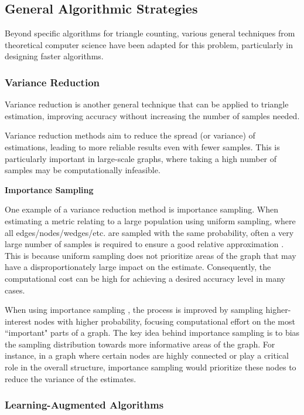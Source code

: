 \documentclass[12pt]{article}
\newcommand{\subsubsubsection}[1]{
  \vspace{1em} %
  \noindent\textbf{#1} %
  \vspace{0.5em} %
}
\begin{document}
\subsection{General Algorithmic Strategies}

Beyond specific algorithms for triangle counting, various general techniques from theoretical computer science have been adapted for this problem, particularly in designing faster algorithms.

\subsubsection{Variance Reduction}

Variance reduction \cite{prescott_monte_1965} is another general technique that can be applied to triangle estimation, improving accuracy without increasing the number of samples needed.

Variance reduction methods aim to reduce the spread (or variance) of estimations, leading to more reliable results even with fewer samples.
This is particularly important in large-scale graphs, where taking a high number of samples may be computationally infeasible.

\subsubsubsection{Importance Sampling}

One example of a variance reduction method is importance sampling.
When estimating a metric relating to a large population using uniform sampling, where all edges/nodes/wedges/etc. are sampled with the same probability, often a very large number of samples is required to ensure a good relative approximation \cite{lovasz_large_2012}.
This is because uniform sampling does not prioritize areas of the graph that may have a disproportionately large impact on the estimate.
Consequently, the computational cost can be high for achieving a desired accuracy level in many cases.

When using importance sampling \cite{motwani_randomized_1995}, the process is improved by sampling higher-interest nodes with higher probability, focusing computational effort on the most ``important" parts of a graph.
The key idea behind importance sampling is to bias the sampling distribution towards more informative areas of the graph.
For instance, in a graph where certain nodes are highly connected or play a critical role in the overall structure, importance sampling would prioritize these nodes to reduce the variance of the estimates.

\subsubsection{Learning-Augmented Algorithms}
\end{document}
